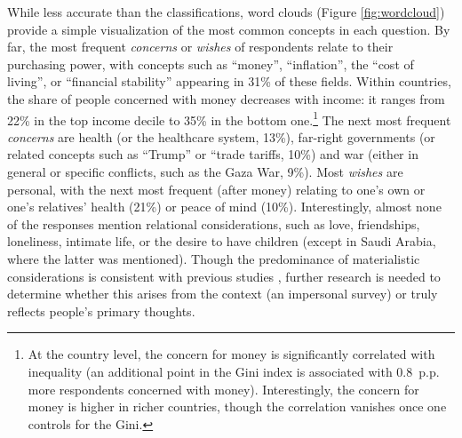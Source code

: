 \documentclass[12pt,english]{article}
\begin{document}
\begin{bibunit}
While less accurate than the classifications, word clouds (Figure \ref{fig:wordcloud}) provide a simple visualization of the most common concepts in each question. By far, the most frequent \textit{concerns} or \textit{wishes} of respondents relate to their purchasing power, with concepts such as ``money'', ``inflation'', the ``cost of living'', or ``financial stability'' appearing in 31\% of these fields. Within countries, the share of people concerned with money decreases with income: it ranges from 22\% in the top income decile to 35\% in the bottom one.\footnote{At the country level, the concern for money is significantly correlated with inequality (an additional point in the Gini index is associated with 0.8~p.p. more respondents concerned with money). %
Interestingly, the concern for money is higher in richer countries, though the correlation vanishes once one controls for the Gini.} 
The next most frequent \textit{concerns} are health (or the healthcare system, 13\%), far-right governments (or related concepts such as ``Trump'' or ``trade tariffs, 10\%) and war (either in general or specific conflicts, such as the Gaza War, 9\%). Most \textit{wishes} are personal, with the next most frequent (after money) relating to one's own or one's relatives' health (21\%) or peace of mind (10\%). Interestingly, almost none of the responses mention relational considerations, such as love, friendships, loneliness, intimate life, or the desire to have children (except in Saudi Arabia, where the latter was mentioned). %
Though the predominance of materialistic considerations is consistent with previous studies \citep{wlezien_salience_2005,singer_who_2011}, further research is needed to determine whether this arises from the context (an impersonal survey) or truly reflects people's primary thoughts. 



\end{bibunit}
\end{document}
